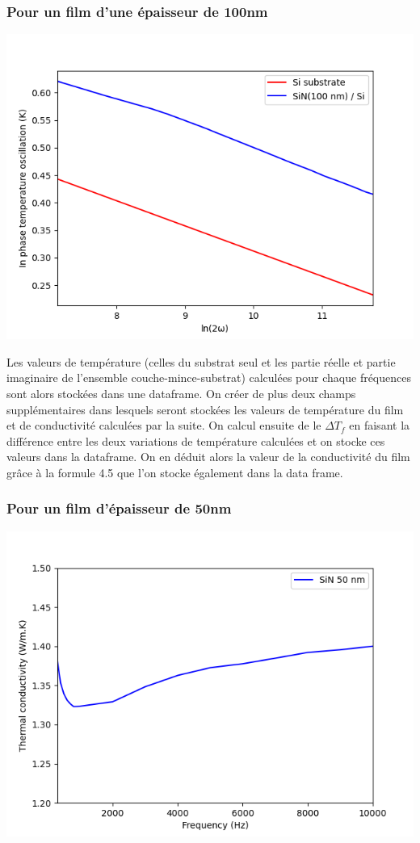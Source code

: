 \documentclass[10pt,a4paper]{report}
\begin{document}
\subsubsection{Pour un film d'une épaisseur de 100nm}
\begin{center}
\includegraphics[scale=0.7]{100nm.png}
\end{center}
Les valeurs  de température (celles du substrat seul et les partie réelle et partie imaginaire de l'ensemble couche-mince-substrat) calculées pour chaque fréquences sont alors stockées dans une dataframe. On créer de plus deux champs supplémentaires dans lesquels seront stockées les valeurs de température du film et de conductivité calculées par la suite.
\newline
On calcul ensuite de le $\Delta T_{f}$ en faisant la différence entre les deux variations de température calculées et on stocke ces valeurs dans la dataframe. On en déduit alors la valeur de la conductivité du film grâce à la formule 4.5 que l'on stocke également dans la data frame.
\subsubsection{Pour un film d'épaisseur de 50nm}
\begin{center}
\includegraphics[scale=0.7]{kappa50nm.png}
\end{center}
\end{document}
